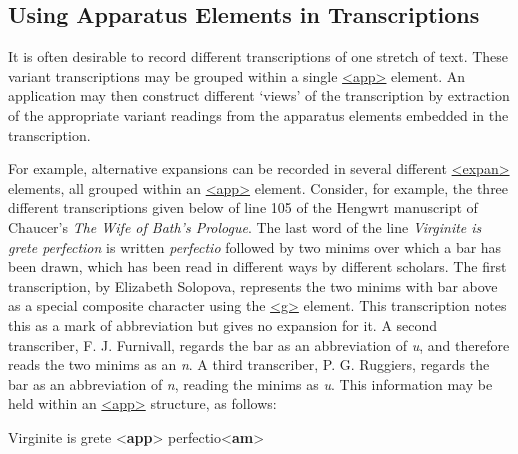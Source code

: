 \subsection[{Using Apparatus Elements in Transcriptions}]{Using Apparatus Elements in Transcriptions}\label{TCTR}\par
It is often desirable to record different transcriptions of one stretch of text. These variant transcriptions may be grouped within a single \hyperref[TEI.app]{<app>} element. An application may then construct different ‘views’ of the transcription by extraction of the appropriate variant readings from the apparatus elements embedded in the transcription.\par
For example, alternative expansions can be recorded in several different \hyperref[TEI.expan]{<expan>} elements, all grouped within an \hyperref[TEI.app]{<app>} element. Consider, for example, the three different transcriptions given below of line 105 of the Hengwrt manuscript of Chaucer's \textit{The Wife of Bath's Prologue}. The last word of the line \textit{Virginite is grete perfection} is written \textit{perfectio} followed by two minims over which a bar has been drawn, which has been read in different ways by different scholars. The first transcription, by Elizabeth Solopova, represents the two minims with bar above as a special composite character using the \hyperref[TEI.g]{<g>} element. This transcription notes this as a mark of abbreviation but gives no expansion for it. A second transcriber, F. J. Furnivall, regards the bar as an abbreviation of \textit{u}, and therefore reads the two minims as an \textit{n}. A third transcriber, P. G. Ruggiers, regards the bar as an abbreviation of \textit{n}, reading the minims as \textit{u}. This information may be held within an \hyperref[TEI.app]{<app>} structure, as follows: \par\bgroup{}\exampleFont \begin{shaded}\noindent\mbox{}Virginite is grete\mbox{}\newline 
{<\textbf{app}>}\mbox{}\newline 
{}perfectio{<\textbf{am}>}\mbox{}\newline 

\end{shaded}
